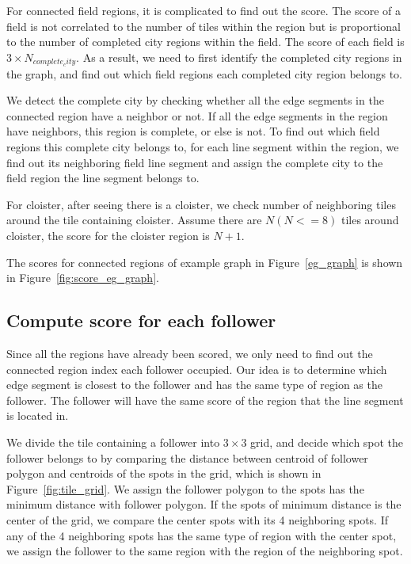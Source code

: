 For connected field regions, it is complicated to find out the score. The score of a field is not correlated to the number of tiles within the region but is proportional to the number of completed city regions within the field. The score of each field is $3\times N_{complete_city}$. As a result, we need to first identify the completed 
city regions in the graph, and find out which field regions each completed city region belongs to.

We detect the complete city by checking whether all the edge segments in the connected region have a neighbor or not. If all the edge segments in the 
region have neighbors, this region is complete, or else is not. To find out which field regions this complete city belongs to, for each 
line segment within the region, we find out its neighboring field line segment and assign the complete city to the field region the line segment belongs to.

For cloister, after seeing there is a cloister, we check number of neighboring tiles around the tile containing cloister. Assume there are $N(N<=8)$ tiles around cloister, the score for the cloister region is $N+1$.

The scores for connected regions of example graph in Figure~\ref{eg_graph} is shown in Figure~\ref{fig:score_eg_graph}.

\subsection{Compute score for each follower}
Since all the regions have already been scored, we only need to find out the connected region index each follower occupied. Our idea is to 
determine which edge segment is closest to the follower and has the same type of region as the follower. The follower will have the same score of the region that the line segment is located in.

We divide the tile containing a follower into $3\times3$ grid, and decide which spot the follower belongs to by comparing the distance between centroid of follower polygon and centroids 
of the spots in the grid, which is shown in Figure~\ref{fig:tile_grid}. We assign the follower polygon to the spots has the minimum distance 
with follower polygon. If the spots of minimum distance is the center of the grid, we compare the center spots with its 4 neighboring spots. If any of the 4 neighboring spots has the same type of region with the center spot, we assign the follower to the same region with the region of the neighboring spot. 

